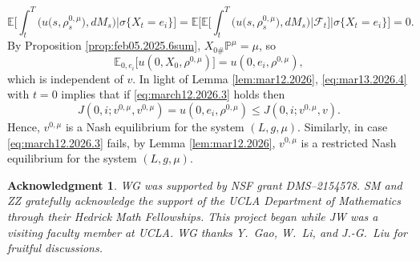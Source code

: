 \documentclass[10pt]{article}
\newtheorem*{ack*}{Acknowledgment}
\numberwithin{equation}{section}
\newcommand{\cF}{ \mathcal{F}}
\newcommand{\bE}{\mathbb E}
\newcommand{\bP}{\mathbb P}
\begin{document}
\begin{equation}\label{eq:mar13.2026.4}
\bE\bigg[\int_t^T\Big(  u\big(s,\rho^{0, \mu}_s\big), dM_s\Big)\bigg| \sigma\{X_t=e_i\}\bigg]=\bE\Bigg[\bE\Big[\int_t^T\Big(  u\big(s,\rho^{0, \mu}_s\big), dM_s\Big)\Big| \cF_t\Big]\bigg| \sigma\{X_t=e_i\}\Bigg]=0.
\end{equation} 
By Proposition \ref{prop:feb05.2025.6sum}, $X_{0 \#}\bP^{\mu}=\mu$, so
\[
\bE_{0, e_i}\Big[u(0, X_0, \rho^{0, \mu})\Big]=u(0, e_i, \rho^{0, \mu}),
\]
which is independent of $v$. In light of Lemma \ref{lem:mar12.2026}, \eqref{eq:mar13.2026.4} with $t=0$ implies that if \eqref{eq:march12.2026.3} holds then
\[
J(0,i; v^{0, \mu}, v^{0, \mu}) = u(0, e_i,\rho^{0, \mu}) \leq J(0,i; v^{0, \mu}, v).
\]
Hence, $v^{0, \mu}$ is a Nash equilibrium for the system $(L, g, \mu).$ Similarly, in case \eqref{eq:march12.2026.3} fails, by Lemma \ref{lem:mar12.2026}, $v^{0, \mu}$ is a restricted Nash equilibrium for the system $(L, g, \mu).$
\endproof



%
\begin{ack*}
WG was supported by NSF grant DMS--2154578. SM and ZZ gratefully acknowledge the support of the UCLA Department of Mathematics through their Hedrick Math Fellowships. This project began while JW was a visiting faculty member at UCLA. WG thanks Y.~Gao, W.~Li, and J.-G.~Liu for fruitful discussions.
\end{ack*}
\end{document}
